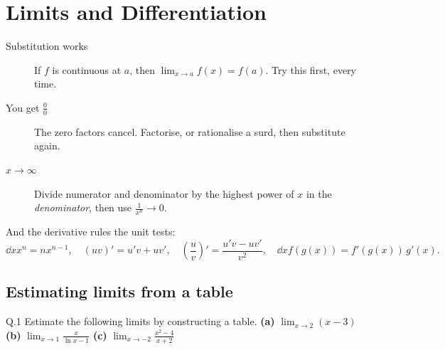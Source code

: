 \chapter{Limits and Differentiation}


\begin{keyidea}
\begin{description}
  \item[Substitution works] If $f$ is continuous at $a$, then
        $\lim_{x\to a}f(x)=f(a)$. Try this first, every time.
  \item[You get $\tfrac00$] The zero factors cancel. Factorise, or rationalise
        a surd, then substitute again.
  \item[$x\to\infty$] Divide numerator and denominator by the highest power of
        $x$ in the \emph{denominator}, then use $\tfrac{1}{x^{n}}\to 0$.
\end{description}
And the derivative rules the unit tests:
\[
\dd{}{x}x^{n}=nx^{n-1},\quad
(uv)'=u'v+uv',\quad
\left(\frac uv\right)'=\frac{u'v-uv'}{v^{2}},\quad
\dd{}{x}f(g(x))=f'(g(x))\,g'(x).
\]
\end{keyidea}

\section{Estimating limits from a table}

\begin{question}{Q.1}
Estimate the following limits by constructing a table.
\textbf{(a)} $\displaystyle\lim_{x\to 2}(x-3)$ \quad
\textbf{(b)} $\displaystyle\lim_{x\to 1}\frac{x}{\ln x -1}$ \quad
\textbf{(c)} $\displaystyle\lim_{x\to -2}\frac{x^{2}-4}{x+2}$
\end{question}

